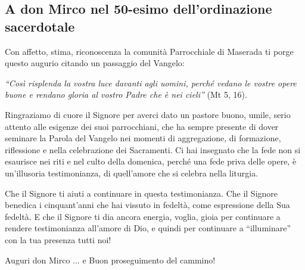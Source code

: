 \subsection{A don Mirco nel 50-esimo dell'ordinazione sacerdotale}


Con affetto, stima, riconoscenza la comunità Parrocchiale di Maserada ti porge questo augurio citando un passaggio del Vangelo:

\textit{``Così risplenda la vostra luce davanti agli uomini, perché vedano le vostre opere buone e rendano gloria al vostro Padre che è nei cieli''} (Mt 5, 16).

Ringraziamo di cuore il Signore per averci dato un pastore buono, umile, serio attento alle esigenze dei suoi parrocchiani, che ha sempre presente di dover seminare la Parola del Vangelo nei momenti di aggregazione, di formazione, riflessione e nella celebrazione dei Sacramenti. Ci hai insegnato che la fede non si esaurisce nei riti e nel culto della domenica, perché una fede priva delle opere, è un’illusoria testimonianza, di quell’amore che si celebra nella liturgia.

Che il Signore ti aiuti a continuare in questa testimonianza. Che il Signore benedica i cinquant’anni che hai vissuto in fedeltà, come espressione della Sua fedeltà. E che il Signore ti dia ancora energia, voglia, gioia per continuare a rendere testimonianza all’amore di Dio, e quindi per continuare a ``illuminare'' con la tua presenza tutti noi!

Auguri don Mirco ... e Buon proseguimento del cammino!


